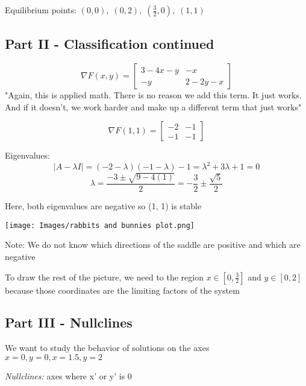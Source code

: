\documentclass[12pt]{article}
\begin{document}
Equilibrium points: $(0, 0), \; (0, 2), \; (\frac{3}{2}, 0),\; (1, 1)$

\subsection*{Part II - Classification continued}
\[\nabla F(x, y) = \begin{bmatrix}
    3 - 4x - y & -x\\
    -y & 2 - 2y - x
\end{bmatrix}\]
"Again, this is applied math. There is no reason we add this term. It just works. And if it doesn't, we work harder and make up a different term that just works"

\[\nabla F(1, 1) = \begin{bmatrix}
    -2 & -1\\
    -1 & -1
\end{bmatrix}\] 

Eigenvalues:
\[| A - \lambda I | = (-2 - \lambda)(-1 - \lambda) - 1 = \lambda^2 + 3 \lambda + 1 = 0\]
\[\lambda = \frac{-3 \pm \sqrt{9 - 4(1)}}{2} = -\frac{3}{2} \pm \frac{\sqrt{5}}{2}\]

Here, both eigenvalues are negative so (1, 1) is stable

\texttt{[image: Images/rabbits and bunnies plot.png]}

Note: We do not know which directions of the saddle are positive and which are negative

To draw the rest of the picture, we need to the region $x \in [0, \frac{3}{2}]$ and $y \in [0, 2]$ because those coordinates are the limiting factors of the system 

\subsection*{Part III - Nullclines}
We want to study the behavior of solutions on the axes $x = 0, y = 0, x = 1.5, y = 2$

\emph{Nullclines:} axes where x' or y' is 0
\end{document}
